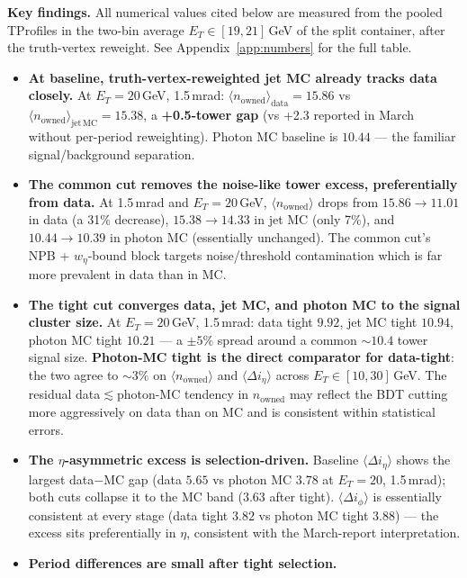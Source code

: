 \documentclass[11pt,a4paper]{article}
\begin{document}
\vspace{0.4em}
\noindent\textbf{Key findings.}
All numerical values cited below are measured from the pooled
TProfiles in the two-bin average $E_T\in[19,21]$\,GeV of the split
container, after the truth-vertex reweight. See
Appendix~\ref{app:numbers} for the full table.
\begin{itemize}
\item \textbf{At baseline, truth-vertex-reweighted jet MC already tracks
  data closely.}  At $E_T\!=\!20$\,GeV, 1.5\,mrad:
  $\langle n_{\mathrm{owned}}\rangle_{\mathrm{data}}\!=\!15.86$ vs
  $\langle n_{\mathrm{owned}}\rangle_{\mathrm{jet\,MC}}\!=\!15.38$,
  a \textbf{+0.5-tower gap} (vs +2.3 reported in March without
  per-period reweighting).  Photon MC baseline is $10.44$ --- the
  familiar signal/background separation.
\item \textbf{The common cut removes the noise-like tower excess,
  preferentially from data.}  At 1.5\,mrad and $E_T\!=\!20$\,GeV,
  $\langle n_{\mathrm{owned}}\rangle$ drops from $15.86\!\to\!11.01$
  in data (a 31\% decrease), $15.38\!\to\!14.33$ in jet MC (only 7\%),
  and $10.44\!\to\!10.39$ in photon MC (essentially unchanged).  The
  common cut's NPB + $w_\eta$-bound block targets noise/threshold
  contamination which is far more prevalent in data than in MC.
\item \textbf{The tight cut converges data, jet MC, and photon MC to
  the signal cluster size.}  At $E_T\!=\!20$\,GeV, 1.5\,mrad:
  data tight $9.92$, jet MC tight $10.94$, photon MC tight $10.21$
  --- a $\pm 5\%$ spread around a common $\sim\!10.4$ tower signal
  size.  \textbf{Photon-MC tight is the direct comparator for
  data-tight}: the two agree to $\sim\!3\%$ on $\langle
  n_{\mathrm{owned}}\rangle$ and $\langle\Delta i_\eta\rangle$
  across $E_T\in[10,30]$\,GeV.  The residual data$\lesssim$photon-MC
  tendency in $n_{\mathrm{owned}}$ may reflect the BDT cutting more
  aggressively on data than on MC and is consistent within
  statistical errors.
\item \textbf{The $\eta$-asymmetric excess is selection-driven.}
  Baseline $\langle\Delta i_\eta\rangle$ shows the largest
  data$-$MC gap (data $5.65$ vs photon MC $3.78$ at $E_T\!=\!20$,
  1.5\,mrad); both cuts collapse it to the MC band ($3.63$ after
  tight).  $\langle\Delta i_\phi\rangle$ is essentially consistent at
  every stage (data tight $3.82$ vs photon MC tight $3.88$) --- the
  excess sits preferentially in $\eta$, consistent with the
  March-report interpretation.
\item \textbf{Period differences are small after tight selection.}

\end{itemize}
\end{document}
